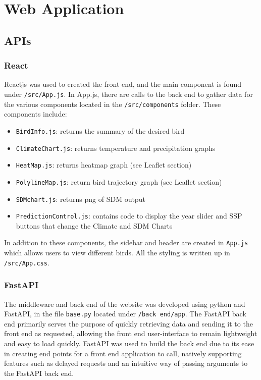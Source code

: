 \documentclass{article}
\begin{document}
\section{Web Application}

\subsection{APIs}

\subsubsection{React}
Reactjs was used to created the front end, and the main component is found under \texttt{/src/App.js}. In App.js, there are calls to the back end to gather data for the various components
located in the \texttt{/src/components} folder. These components include:
\begin{itemize}
	\item \texttt{BirdInfo.js}: returns the summary of the desired bird
	\item \texttt{ClimateChart.js}: returns temperature and precipitation graphs
	\item \texttt{HeatMap.js}: returns heatmap graph (see Leaflet section)
	\item \texttt{PolylineMap.js}: return bird trajectory graph (see Leaflet section)
	\item \texttt{SDMchart.js}: returns png of SDM output
	\item \texttt{PredictionControl.js}: contains code to display the year slider and SSP buttons that change the Climate and SDM Charts
\end{itemize}

\noindent In addition to these components, the sidebar and header are created in \texttt{App.js} which allows users to view different birds. All the styling is written up in \texttt{/src/App.css}. 


\subsubsection{FastAPI}
The middleware and back end of the website was developed using python and FastAPI, in the file \texttt{base.py} located under \texttt{/back end/app}. The FastAPI back end primarily serves the purpose of quickly retrieving data and sending it to the front end as requested, allowing the front end user-interface to remain lightweight and easy to load quickly. FastAPI was used to build the back end due to its ease in creating end points for a front end application to call, natively supporting features such as delayed requests and an intuitive way of passing arguments to the FastAPI back end.
\end{document}
